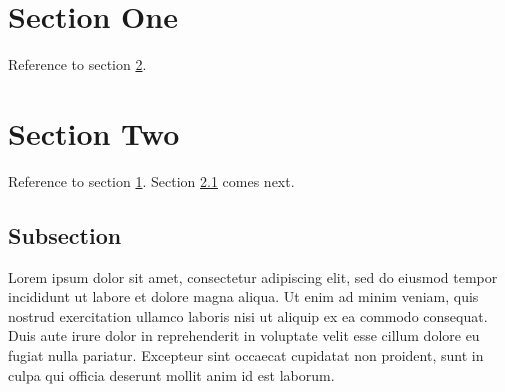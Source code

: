 \hypertarget{section-one}{%
\section{Section One}\label{section-one}}

Reference to section \ref{sec:2}.

\hypertarget{sec:2}{%
\section{Section Two}\label{sec:2}}

Reference to section \ref{section-one}. Section \ref{subsection} comes
next.

\hypertarget{subsection}{%
\subsection{Subsection}\label{subsection}}

Lorem ipsum dolor sit amet, consectetur adipiscing elit, sed do eiusmod
tempor incididunt ut labore et dolore magna aliqua. Ut enim ad minim
veniam, quis nostrud exercitation ullamco laboris nisi ut aliquip ex ea
commodo consequat. Duis aute irure dolor in reprehenderit in voluptate
velit esse cillum dolore eu fugiat nulla pariatur. Excepteur sint
occaecat cupidatat non proident, sunt in culpa qui officia deserunt
mollit anim id est laborum.
